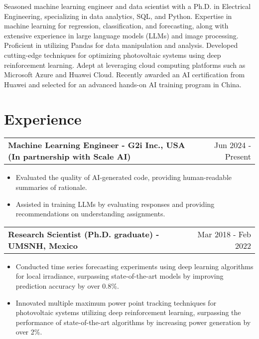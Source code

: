 \documentclass[a4paper,10pt]{article}
\makeatletter
\newenvironment{joblong}[2]
    {
    \begin{tabularx}{\linewidth}{@{}l X r@{}}
    \textbf{#1} & \hfill &  #2 \\[3.75pt]
    \end{tabularx}
    \begin{minipage}[t]{\linewidth}
    \begin{itemize}[nosep,after=\strut, leftmargin=1em, itemsep=3pt,label=--]
    }
    {
    \end{itemize}
    \end{minipage}    
    }
\makeatother
\begin{document}
Seasoned machine learning engineer and data scientist with a Ph.D. in Electrical Engineering, specializing in data analytics, SQL, and Python. Expertise in machine learning for regression, classification, and forecasting, along with extensive experience in large language models (LLMs) and image processing. Proficient in utilizing Pandas for data manipulation and analysis. Developed cutting-edge techniques for optimizing photovoltaic systems using deep reinforcement learning. Adept at leveraging cloud computing platforms such as Microsoft Azure and Huawei Cloud. Recently awarded an AI certification from Huawei and selected for an advanced hands-on AI training program in China.

\section{Experience}

\begin{joblong}{Machine Learning Engineer - G2i Inc., USA (In partnership with Scale AI)}{Jun 2024 - Present}
    \item Evaluated the quality of AI-generated code, providing human-readable summaries of rationale.
    \item Assisted in training LLMs by evaluating responses and providing recommendations on understanding assignments.
\end{joblong}

\begin{joblong}{Research Scientist (Ph.D. graduate) - UMSNH, Mexico}{Mar 2018 - Feb 2022}
\item Conducted time series forecasting experiments using deep learning algorithms for local irradiance, surpassing state-of-the-art models by improving prediction accuracy by over 0.8\%.
\item Innovated multiple maximum power point tracking techniques for photovoltaic systems utilizing deep reinforcement learning, surpassing the performance of state-of-the-art algorithms by increasing power generation by over 2\%.
\end{joblong}
\end{document}
